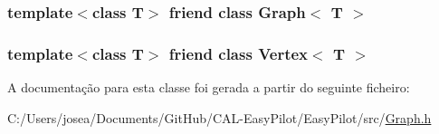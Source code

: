 \subsubsection[{Graph$<$ T $>$}]{\setlength{\rightskip}{0pt plus 5cm}template$<$class T$>$ friend class {\bf Graph}$<$ T $>$\hspace{0.3cm}{\ttfamily [friend]}}\label{class_edge_aefa9b76cd57411c5354e5620dc2d84dd}
\hypertarget{class_edge_a2e120a12dec663fa334633b4f26cbed8}{}
\subsubsection[{Vertex$<$ T $>$}]{\setlength{\rightskip}{0pt plus 5cm}template$<$class T$>$ friend class {\bf Vertex}$<$ T $>$\hspace{0.3cm}{\ttfamily [friend]}}\label{class_edge_a2e120a12dec663fa334633b4f26cbed8}


A documentação para esta classe foi gerada a partir do seguinte ficheiro\+:\begin{DoxyCompactItemize}
\item 
C\+:/\+Users/josea/\+Documents/\+Git\+Hub/\+C\+A\+L-\/\+Easy\+Pilot/\+Easy\+Pilot/src/\hyperlink{_graph_8h}{Graph.\+h}\end{DoxyCompactItemize}
